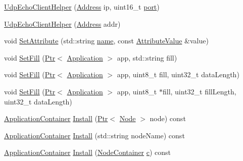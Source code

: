 \begin{DoxyCompactItemize}
\item 
\hyperlink{classns3_1_1UdpEchoClientHelper_a08e650c741d5f5692cbcccd2031f2d4d}{Udp\+Echo\+Client\+Helper} (\hyperlink{classns3_1_1Address}{Address} ip, uint16\+\_\+t \hyperlink{visualizer-ideas_8txt_a21ff1c530daf8435e00048b7fc2c58e3}{port})
\item 
\hyperlink{classns3_1_1UdpEchoClientHelper_a0cca401b653070383012af345e861a45}{Udp\+Echo\+Client\+Helper} (\hyperlink{classns3_1_1Address}{Address} addr)
\item 
void \hyperlink{classns3_1_1UdpEchoClientHelper_a11228c069ad896f8ed13f4d37c13f51d}{Set\+Attribute} (std\+::string \hyperlink{generate__test__data__lte__spectrum__model_8m_ab74e6bf80237ddc4109968cedc58c151}{name}, const \hyperlink{classns3_1_1AttributeValue}{Attribute\+Value} \&value)
\item 
void \hyperlink{classns3_1_1UdpEchoClientHelper_aea022aaee2f0e82f2f3795025dfafec3}{Set\+Fill} (\hyperlink{classns3_1_1Ptr}{Ptr}$<$ \hyperlink{classns3_1_1Application}{Application} $>$ app, std\+::string fill)
\item 
void \hyperlink{classns3_1_1UdpEchoClientHelper_a840e5ed803c5b7fea55f180c7b3c224c}{Set\+Fill} (\hyperlink{classns3_1_1Ptr}{Ptr}$<$ \hyperlink{classns3_1_1Application}{Application} $>$ app, uint8\+\_\+t fill, uint32\+\_\+t data\+Length)
\item 
void \hyperlink{classns3_1_1UdpEchoClientHelper_a84fe5f87f03d6aefce7a42eba712f02b}{Set\+Fill} (\hyperlink{classns3_1_1Ptr}{Ptr}$<$ \hyperlink{classns3_1_1Application}{Application} $>$ app, uint8\+\_\+t $\ast$fill, uint32\+\_\+t fill\+Length, uint32\+\_\+t data\+Length)
\item 
\hyperlink{classns3_1_1ApplicationContainer}{Application\+Container} \hyperlink{classns3_1_1UdpEchoClientHelper_af857bf4dd90e4bdf13e05d749196e2f1}{Install} (\hyperlink{classns3_1_1Ptr}{Ptr}$<$ \hyperlink{classns3_1_1Node}{Node} $>$ node) const 
\item 
\hyperlink{classns3_1_1ApplicationContainer}{Application\+Container} \hyperlink{classns3_1_1UdpEchoClientHelper_ab30435a4aa83a013ddd6327e4aaab991}{Install} (std\+::string node\+Name) const 
\item 
\hyperlink{classns3_1_1ApplicationContainer}{Application\+Container} \hyperlink{classns3_1_1UdpEchoClientHelper_a989273936ce3f831cf1ac4e4b63da635}{Install} (\hyperlink{classns3_1_1NodeContainer}{Node\+Container} \hyperlink{mmwave_2model_2fading-traces_2fading__trace__generator_8m_ae0323a9039add2978bf5b49550572c7c}{c}) const 
\end{DoxyCompactItemize}
